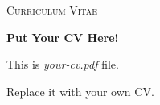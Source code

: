 \documentclass[11pt]{article}
\begin{document}
\pagestyle{fancy}
\fancyhf{}
\renewcommand{\headrulewidth}{0pt}

\begin{center}
	\textsc{\Large Curriculum Vitae}

	\vspace{2cm}

	\Huge \textbf{Put Your CV Here!}

	\vspace{5cm}

	This is \emph{your-cv.pdf} file.

	Replace it with your own CV.
\end{center}
\end{document}
